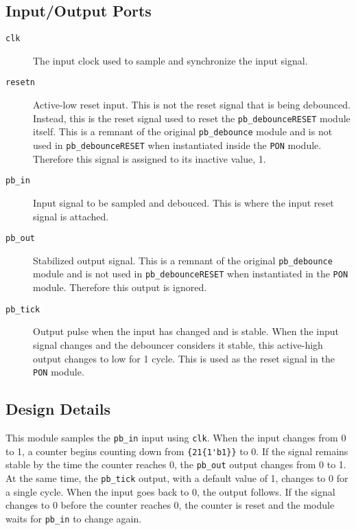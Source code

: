 \subsection{Input/Output Ports}
\begin{description}
	\item[\texttt{clk}] The input clock used to sample and synchronize the input signal.
	\item[\texttt{resetn}] Active-low reset input. This is not the reset signal that is being debounced. Instead, this is the reset signal used to reset the \texttt{pb\_debounceRESET} module itself. This is a remnant of the original \texttt{pb\_debounce} module and is not used in \texttt{pb\_debounceRESET} when instantiated inside the \texttt{PON} module. Therefore this signal is assigned to its inactive value, 1.
	\item[\texttt{pb\_in}] Input signal to be sampled and debouced. This is where the input reset signal is attached.
	\item[\texttt{pb\_out}] Stabilized output signal. This is a remnant of the original \texttt{pb\_debounce} module and is not used in \texttt{pb\_debounceRESET} when instantiated in the \texttt{PON} module. Therefore this output is ignored.
	\item[\texttt{pb\_tick}] Output pulse when the input has changed and is stable. When the input signal changes and the debouncer considers it stable, this active-high output changes to low for 1 cycle. This is used as the reset signal in the \texttt{PON} module.
\end{description}

\subsection{Design Details}
This module samples the \texttt{pb\_in} input using \texttt{clk}. When the input changes from 0 to 1, a counter begins counting down from \texttt{\{21\{1\'{}b1\}\}} to 0. If the signal remains stable by the time the counter reaches 0, the \texttt{pb\_out} output changes from 0 to 1. At the same time, the \texttt{pb\_tick} output, with a default value of 1, changes to 0 for a single cycle. When the input goes back to 0, the output follows. If the signal changes to 0 before the counter reaches 0, the counter is reset and the module waits for \texttt{pb\_in} to change again.

